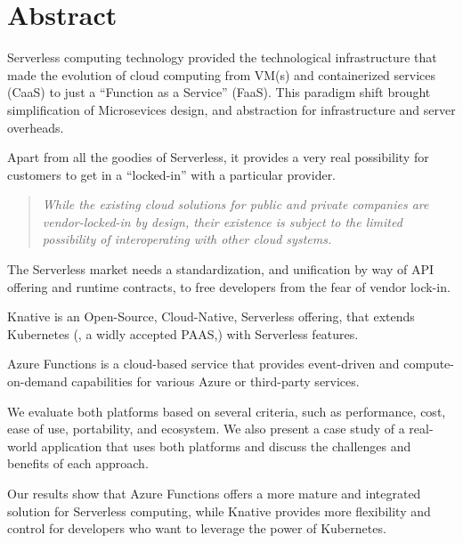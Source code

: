 \documentclass[12pt]{article}
\begin{document}
\section*{Abstract}
\begin{flushleft}
Serverless computing technology provided the technological infrastructure that made the evolution of cloud computing from VM(s) and containerized services (CaaS) to just a “Function as a Service” (FaaS). This paradigm shift brought simplification of Microsevices design, and abstraction for infrastructure and server overheads.

Apart from all the goodies of Serverless, it provides a very real possibility for customers to get in a “locked-in” with a particular provider. 

\begin{quote}
    \textit{While the existing cloud solutions for public and private companies are vendor-locked-in by design, their existence is subject to the limited possibility of interoperating with other cloud systems.}\\
    \cite{Opara-Martins-2014} 
\end{quote}

The Serverless market needs a standardization, and unification by way of API offering and runtime contracts, to free developers from the fear of vendor lock-in. 

Knative is an Open-Source, Cloud-Native, Serverless offering, that extends Kubernetes (, a widly accepted PAAS,) with Serverless features. 

Azure Functions is a cloud-based service that provides event-driven and compute-on-demand capabilities for various Azure or third-party services. 

We evaluate both platforms based on several criteria, such as performance, cost, ease of use, portability, and ecosystem. We also present a case study of a real-world application that uses both platforms and discuss the challenges and benefits of each approach. 

Our results show that Azure Functions offers a more mature and integrated solution for Serverless computing, while Knative provides more flexibility and control for developers who want to leverage the power of Kubernetes.
    
\end{flushleft}
\pagebreak
\end{document}
